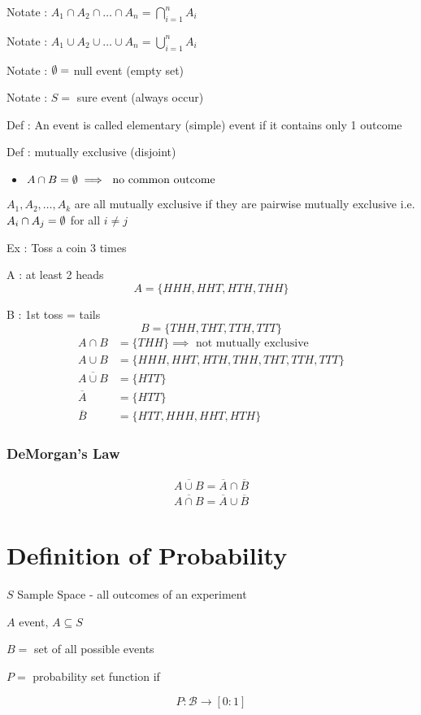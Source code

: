 Notate : $A_1 \cap A_2 \cap \ldots \cap A_n = \bigcap_{i = 1}^n A_i$

Notate : $A_1 \cup A_2 \cup \ldots \cup A_n = \bigcup_{i = 1}^n A_i$

Notate : $\emptyset = $ null event (empty set)

Notate : $S = $ sure event (always occur)

Def : An event is called elementary (simple) event if it contains only 1 outcome

Def : mutually exclusive (disjoint)

\begin{itemize}
    \item $A \cap B = \emptyset \implies \text{ no common outcome}$
\end{itemize}

$A_1, A_2, \ldots, A_k$ are all mutually exclusive if they are pairwise mutually exclusive i.e. $A_i \cap A_j = \emptyset$ for all $i \not= j$

Ex : Toss a coin 3 times

A : at least 2 heads
\[
    A = \{HHH, HHT, HTH, THH \}
\] 

B : 1st toss = tails
\[
    B = \{ THH, THT, TTH, TTT \}
\] 
\begin{align*}
    A \cap B &= \{ THH \} \implies \text{ not mutually exclusive} \\
    A \cup B &= \{ HHH, HHT, HTH, THH, THT, TTH, TTT \} \\
    \overline{A \cup B} &= \{ HTT \} \\
    \overline{A} &= \{ HTT \} \\
    \overline{B} &= \{ HTT, HHH, HHT, HTH \}
\end{align*}
\subsubsection*{DeMorgan's Law}

\begin{align*}
    \overline{A \cup B} = \overline{A} \cap \overline{B} \\
\overline{A \cap B} = \overline{A} \cup \overline{B}
\end{align*}

\section*{Definition of Probability}

$S$ Sample Space - all outcomes of an experiment

$A$ event, $A \subseteq S$ 

$B = $ set of all possible events

$P  = $ probability set function if 
\[
    P : \mathcal{B} \to [0:1]
\] 


